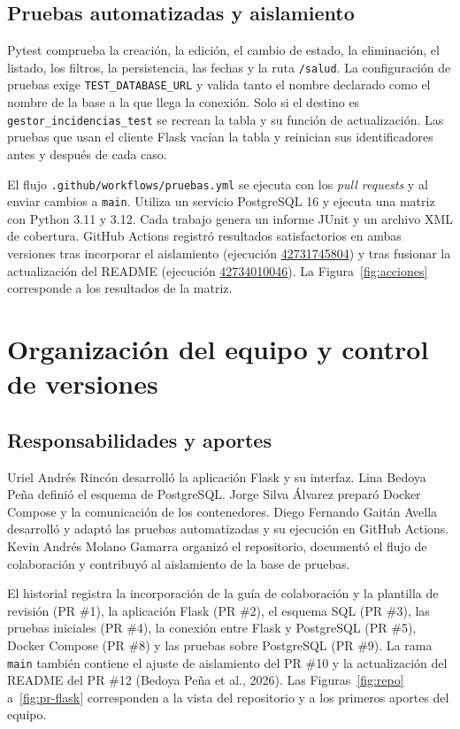 \documentclass[12pt,letterpaper]{article}
\begin{document}
\subsection{Pruebas automatizadas y aislamiento}

Pytest comprueba la creación, la edición, el cambio de estado, la eliminación, el listado, los filtros, la persistencia, las fechas y la ruta \texttt{/salud}. La configuración de pruebas exige \texttt{TEST\_DATABASE\_URL} y valida tanto el nombre declarado como el nombre de la base a la que llega la conexión. Solo si el destino es \texttt{gestor\_incidencias\_test} se recrean la tabla y su función de actualización. Las pruebas que usan el cliente Flask vacían la tabla y reinician sus identificadores antes y después de cada caso.

El flujo \texttt{.github/workflows/pruebas.yml} se ejecuta con los \textit{pull requests} y al enviar cambios a \texttt{main}. Utiliza un servicio PostgreSQL 16 y ejecuta una matriz con Python 3.11 y 3.12. Cada trabajo genera un informe JUnit y un archivo XML de cobertura. GitHub Actions registró resultados satisfactorios en ambas versiones tras incorporar el aislamiento (ejecución \href{https://github.com/kmolano-dot/gestor-incidencias/actions/runs/42731745804}{42731745804}) y tras fusionar la actualización del README (ejecución \href{https://github.com/kmolano-dot/gestor-incidencias/actions/runs/42734010046}{42734010046}). La Figura~\ref{fig:acciones} corresponde a los resultados de la matriz.

\section{Organización del equipo y control de versiones}

\subsection{Responsabilidades y aportes}

Uriel Andrés Rincón desarrolló la aplicación Flask y su interfaz. Lina Bedoya Peña definió el esquema de PostgreSQL. Jorge Silva Álvarez preparó Docker Compose y la comunicación de los contenedores. Diego Fernando Gaitán Avella desarrolló y adaptó las pruebas automatizadas y su ejecución en GitHub Actions. Kevin Andrés Molano Gamarra organizó el repositorio, documentó el flujo de colaboración y contribuyó al aislamiento de la base de pruebas.

El historial registra la incorporación de la guía de colaboración y la plantilla de revisión (PR \#1), la aplicación Flask (PR \#2), el esquema SQL (PR \#3), las pruebas iniciales (PR \#4), la conexión entre Flask y PostgreSQL (PR \#5), Docker Compose (PR \#8) y las pruebas sobre PostgreSQL (PR \#9). La rama \texttt{main} también contiene el ajuste de aislamiento del PR \#10 y la actualización del README del PR \#12 (Bedoya Peña et al., 2026). Las Figuras~\ref{fig:repo} a~\ref{fig:pr-flask} corresponden a la vista del repositorio y a los primeros aportes del equipo.
\end{document}
